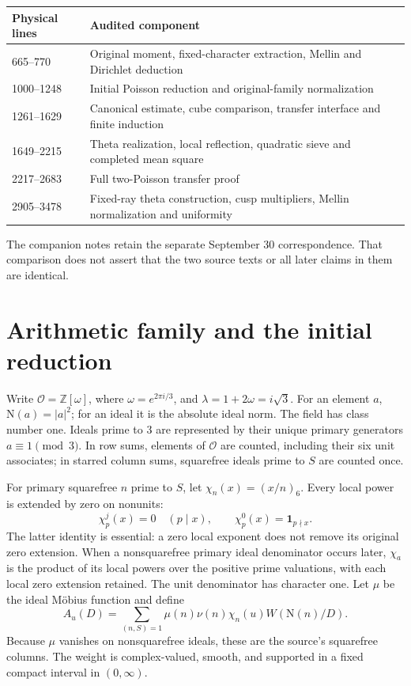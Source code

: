 \documentclass[11pt]{article}
\numberwithin{equation}{section}
\theoremstyle{definition}
\theoremstyle{remark}
\newcommand{\OO}{\mathcal O}
\newcommand{\N}{\mathrm N}
\newcommand{\ind}{\mathbf 1}
\begin{document}
\begin{center}\small
\begin{tabularx}{\textwidth}{@{}lX@{}}
\toprule
Physical lines & Audited component\\
\midrule
665--770 & Original moment, fixed-character extraction, Mellin and Dirichlet deduction\\
1000--1248 & Initial Poisson reduction and original-family normalization\\
1261--1629 & Canonical estimate, cube comparison, transfer interface and finite induction\\
1649--2215 & Theta realization, local reflection, quadratic sieve and completed mean square\\
2217--2683 & Full two-Poisson transfer proof\\
2905--3478 & Fixed-ray theta construction, cusp multipliers, Mellin normalization and uniformity\\
\bottomrule
\end{tabularx}
\end{center}
The companion notes retain the separate September 30 correspondence.
That comparison does not assert that the two source texts or all
later claims in them are identical.

\section{Arithmetic family and the initial reduction}\label{sec:initial}

Write \(\OO=\mathbb Z[\omega]\), where
\(\omega=e^{2\pi i/3}\), and \(\lambda=1+2\omega=i\sqrt3\).
For an element \(a\), \(\N(a)=|a|^2\); for an ideal it is the
absolute ideal norm. The field has class number one. Ideals prime
to \(3\) are represented by their unique primary generators
\(a\equiv1\pmod3\). In row sums, elements of \(\OO\) are counted,
including their six unit associates; in starred column sums,
squarefree ideals prime to \(S\) are counted once.

For primary squarefree \(n\) prime to \(S\), let
\(\chi_n(x)=(x/n)_6\). Every local power is extended by zero
on nonunits:
\[
 \chi_p^j(x)=0\quad(p\mid x),\qquad
 \chi_p^0(x)=\ind_{p\nmid x}.
\]
The latter identity is essential: a zero local exponent does not
remove its original zero extension. When a nonsquarefree primary
ideal denominator occurs later, \(\chi_a\) is the product of its
local powers over the positive prime valuations, with each local
zero extension retained. The unit denominator has character one.
 Let \(\mu\) be the ideal
M\"obius function and define
\begin{equation}\label{eq:A}
 A_u(D)=\sum_{(n,S)=1}\mu(n)\nu(n)\chi_n(u)
                      W(\N(n)/D).
\end{equation}
Because \(\mu\) vanishes on nonsquarefree ideals, these are the
source's squarefree columns. The weight is complex-valued, smooth,
and supported in a fixed compact interval in \((0,\infty)\).
\end{document}
